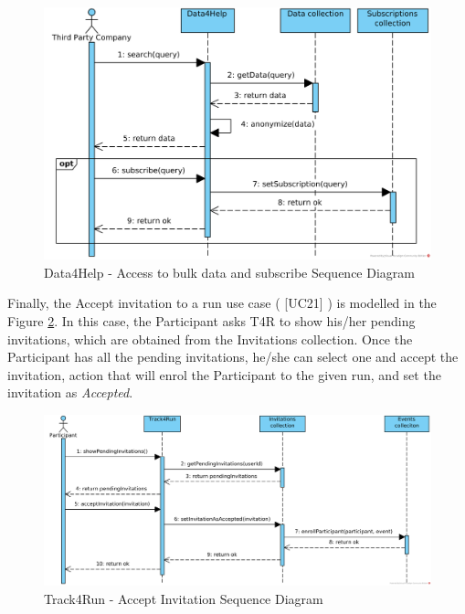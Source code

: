 \documentclass[a4paper, hidelinks, 12pt]{report}
\newcommand\usecase[1]{ [UC#1] }
\begin{document}
	\begin{figure}[H]
		\centering
		\includegraphics[width=1\textwidth]{Diagrams/d4h_seq_subscribe_to_bulk_query.png}
		\caption[Data4Help - Access to bulk data and subscribe Sequence Diagram]{Data4Help - Access to bulk data and subscribe Sequence Diagram}
		\label{fig:d4h_seq_bulk_data}
	\end{figure}
	
	Finally, the Accept invitation to a run use case (\usecase{21}) is modelled in the Figure \ref{fig:t4r_accept_invitation}. In this case, the Participant asks T4R to show his/her pending invitations, which are obtained from the Invitations collection. Once the Participant has all the pending invitations, he/she can select one and accept the invitation, action that will enrol the Participant to the given run, and set the invitation as \textit{Accepted}.
	
	\begin{figure}[H]
		\centering
		\includegraphics[width=1\textwidth]{Diagrams/t4r_seq_accept_invitation.png}
		\caption[Track4Run - Accept Invitation Sequence Diagram]{Track4Run - Accept Invitation Sequence Diagram}
		\label{fig:t4r_accept_invitation}
	\end{figure}
		
\end{document}

